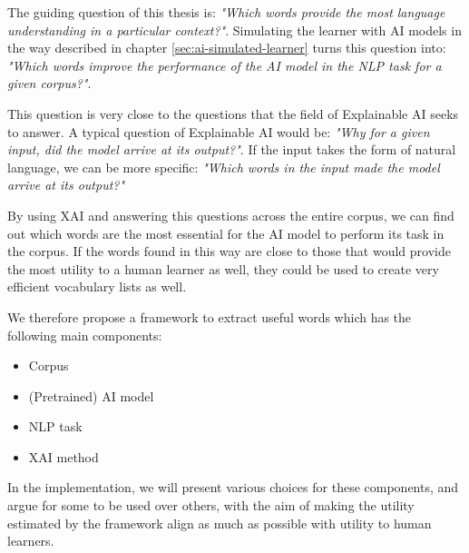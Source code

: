 The guiding question of this thesis is:
\textit{"Which words provide the most language understanding in a particular context?"}.
Simulating the learner with AI models in the way described in chapter \ref{sec:ai-simulated-learner} turns this question into:
\textit{"Which words improve the performance of the AI model in the NLP task for a given corpus?"}.

This question is very close to the questions that the field of Explainable AI seeks to answer.
A typical question of Explainable AI would be:
\textit{"Why for a given input, did the model arrive at its output?"}.
If the input takes the form of natural language, we can be more specific:
\textit{"Which words in the input made the model arrive at its output?"}

By using XAI and answering this questions across the entire corpus, we can find out which words are the most essential for the AI model to perform its task in the corpus.
If the words found in this way are close to those that would provide the most utility to a human learner as well, they could be used to create very efficient vocabulary lists as well.


We therefore propose a framework to extract useful words which has the following main components:
\begin{itemize}
	\item Corpus
	\item (Pretrained) AI model
	\item NLP task
	\item XAI method
\end{itemize}

In the implementation, we will present various choices for these components, and argue for some to be used over others, with the aim of making the utility estimated by the framework align as much as possible with utility to human learners.

%
%

